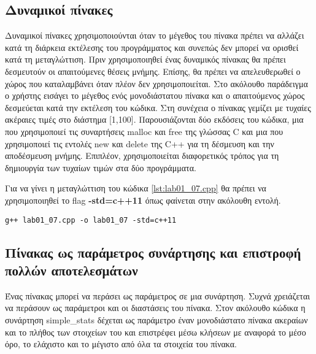 \subsection{Δυναμικοί πίνακες}
Δυναμικοί πίνακες χρησιμοποιούνται όταν το μέγεθος του πίνακα πρέπει να αλλάζει κατά τη διάρκεια εκτέλεσης του προγράμματος και συνεπώς δεν μπορεί να ορισθεί κατά τη μεταγλώττιση. Πριν χρησιμοποιηθεί ένας δυναμικός πίνακας θα πρέπει δεσμευτούν οι απαιτούμενες θέσεις μνήμης. Επίσης, θα πρέπει να απελευθερωθεί ο χώρος που καταλαμβάνει όταν πλέον δεν χρησιμοποιείται. Στο ακόλουθο παράδειγμα ο χρήστης εισάγει το μέγεθος ενός μονοδιάστατου πίνακα και ο απαιτούμενος χώρος δεσμεύεται κατά την εκτέλεση του κώδικα. Στη συνέχεια ο πίνακας γεμίζει με τυχαίες ακέραιες τιμές στο διάστημα [1,100]. Παρουσιάζονται δύο εκδόσεις του κώδικα, μια που χρησιμοποιεί τις συναρτήσεις malloc και free της γλώσσας C και μια που χρησιμοποιεί τις εντολές new και delete της C++ για τη δέσμευση και την αποδέσμευση μνήμης. Επιπλέον, χρησιμοποιείται διαφορετικός τρόπος για τη δημιουργία των τυχαίων τιμών στα δύο προγράμματα.








Για να γίνει η μεταγλώττιση του κώδικα \ref{lst:lab01_07.cpp} θα πρέπει να χρησιμοποιηθεί το flag \textbf{-std=c++11} όπως φαίνεται στην ακόλουθη εντολή.

\begin{lstlisting}[style=DOS]
g++ lab01_07.cpp -o lab01_07 -std=c++11
\end{lstlisting}

\subsection{Πίνακας ως παράμετρος συνάρτησης και επιστροφή πολλών αποτελεσμάτων}
Ένας πίνακας μπορεί να περάσει ως παράμετρος σε μια συνάρτηση. Συχνά χρειάζεται να περάσουν ως παράμετροι και οι διαστάσεις του πίνακα. Στον ακόλουθο κώδικα η συνάρτηση simple\_stats δέχεται ως παράμετρο έναν μονοδιάστατο  πίνακα ακεραίων και το πλήθος των στοιχείων του και επιστρέφει μέσω κλήσεων με αναφορά το μέσο όρο, το ελάχιστο και το μέγιστο από όλα τα στοιχεία του πίνακα.

